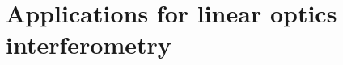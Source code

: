 \documentclass[times,final]{elsarticle}
\newcommand{\peter}[1]{{\color{red}{#1}}}
\begin{document}




\section{Applications for linear optics interferometry}\label{sec:applications}
\end{document}
